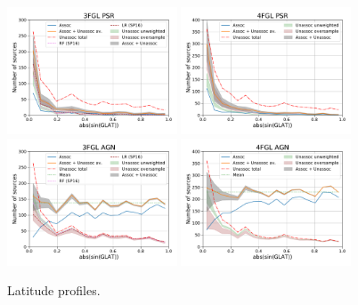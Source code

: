 \begin{figure}[h]
\center
\includegraphics[width=0.45\textwidth]{plots/lat_profile_PSR_3FGL_oversample.pdf}
\includegraphics[width=0.45\textwidth]{plots/lat_profile_PSR_4FGL_oversample.pdf} \\
\includegraphics[width=0.45\textwidth]{plots/lat_profile_AGN_3FGL_oversample.pdf}
\includegraphics[width=0.45\textwidth]{plots/lat_profile_AGN_4FGL_oversample.pdf}
\caption{Latitude profiles.}  
\label{fig:lat_profile}
\end{figure}




